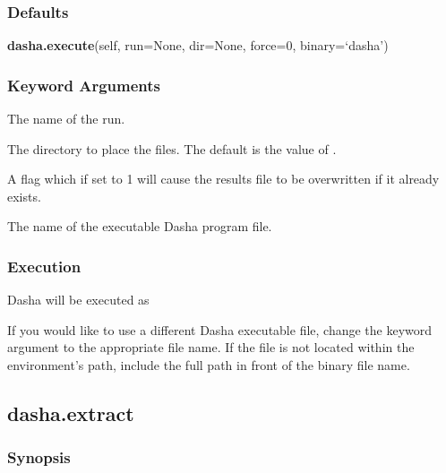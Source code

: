   
 \subsubsection{Defaults} 

 \textsf{\textbf{dasha.execute}(self, run=None, dir=None, force=0, binary=`dasha')} 

  
 \subsubsection{Keyword Arguments} 

   The name of the run.   

   The directory to place the files.  The default is the value of .   

   A flag which if set to 1 will cause the results file to be overwritten if it already exists.   

   The name of the executable Dasha program file.  

  

  
 \subsubsection{Execution} 

 Dasha will be executed as 
  


 If you would like to use a different Dasha executable file, change the keyword argument  to the appropriate file name.  If the file is not located within the environment's path, include the full path in front of the binary file name. 
  

  

 \newpage 

 \subsection{dasha.extract} 

  
 \subsubsection{Synopsis} 

